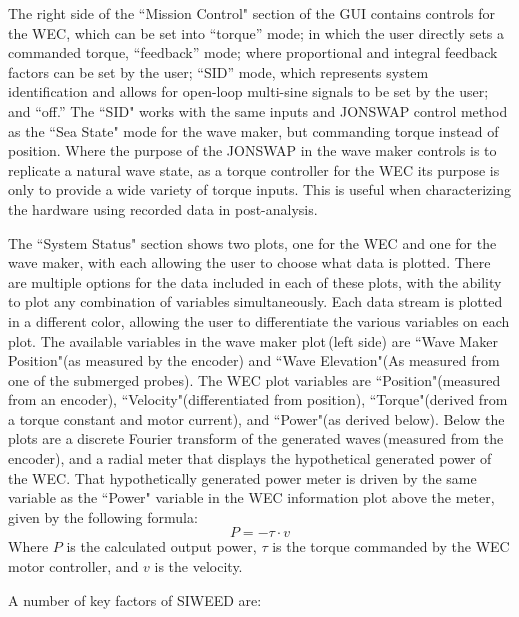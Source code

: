\documentclass[11pt, letterpaper]{article}
\begin{document}
The right side of the ``Mission Control" section of the GUI  contains controls for the WEC, which can be set into ``torque'' mode; in which the user directly sets a commanded torque, ``feedback'' mode; where proportional and integral feedback factors can be set by the user; ``SID'' mode, which represents system identification and allows for open-loop multi-sine signals to be set by the user; and ``off.''
The ``SID" works with the same inputs and JONSWAP control method as the ``Sea State" mode for the wave maker, but commanding torque instead of position.
Where the purpose of the JONSWAP in the wave maker controls is to replicate a natural wave state, as a torque controller for the WEC its purpose is only to provide a wide variety of torque inputs. 
This is useful when characterizing the hardware using recorded data in post-analysis.

The ``System Status" section shows two plots, one for the WEC and one for the wave maker, with each allowing the user to choose what data is plotted. 
There are multiple options for the data included in each of these plots, with the ability to plot any combination of variables simultaneously.
Each data stream is plotted in a different color, allowing the user to differentiate the various variables on each plot.
The available variables in the wave maker plot\,(left side) are ``Wave Maker Position"(as measured by the encoder) and ``Wave Elevation"(As measured from one of the submerged probes).
The WEC plot variables are ``Position"(measured from an encoder), ``Velocity"(differentiated from position), ``Torque"(derived from a torque constant and motor current), and ``Power"(as derived below).
Below the plots are a discrete Fourier transform of the generated waves\,(measured from the encoder), and a radial meter that displays the hypothetical generated power of the WEC.
That hypothetically generated power meter is driven by the same variable as the ``Power" variable in the WEC information plot above the meter, given by the following formula:
\begin{equation}
  P = -\tau \cdot v
\end{equation}
Where $P$ is the calculated output power, $\tau$ is the torque commanded by the WEC motor controller, and $v$ is the velocity.

A number of key factors of SIWEED are:
\end{document}
